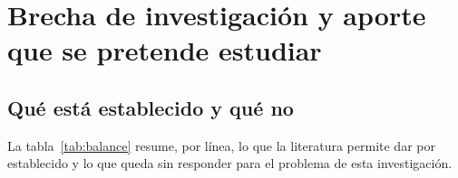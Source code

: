 \section{Brecha de investigación y aporte que se pretende estudiar}
\label{sec:brecha}

\subsection{Qué está establecido y qué no}
\label{sec:brecha-balance}

La tabla~\ref{tab:balance} resume, por línea, lo que la literatura permite dar por
establecido y lo que queda sin responder para el problema de esta investigación.

